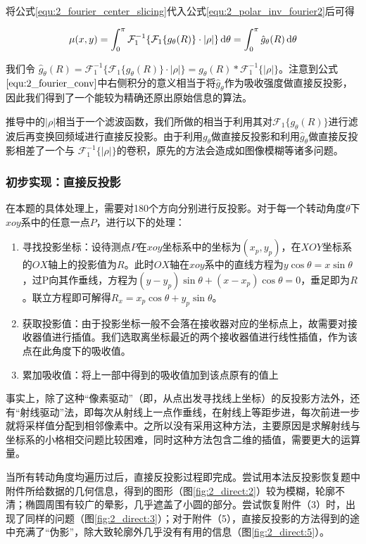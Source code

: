 将公式\ref{equ:2_fourier_center_slicing}代入公式\ref{equ:2_polar_inv_fourier2}后可得

\begin{equation}
	\mu(x, y) = \int_0^{\pi} \mathcal F_1^{-1} \{ \mathcal F_1\{ g_\theta(R) \}\cdot |\rho| \} \mathop{}\!\mathrm{d} \theta
	          = \int_0^\pi \hat g_\theta(R) \mathop{}\!\mathrm{d} \theta
	\label{equ:2_fourier_conv}
\end{equation}

我们令 $\hat g_\theta(R) = \mathcal F_1^{-1} \{ \mathcal F_1\{ g_\theta(R) \}\cdot |\rho| \} = g_\theta(R) \ast \mathcal F^{-1}_1 \{ |\rho| \}$。注意到公式$\ref{equ:2_fourier_conv}$中右侧积分的意义相当于将$\hat g_\theta$作为吸收强度做直接反投影，因此我们得到了一个能较为精确还原出原始信息的算法。

推导中的$|\rho|$相当于一个滤波函数，我们所做的相当于利用其对$\mathcal F_1\{ g_\theta(R) \}$进行滤波后再变换回频域进行直接反投影。由于利用$g_\theta$做直接反投影和利用$\hat g_\theta$做直接反投影相差了一个与 $\mathcal F_1^{-1}\{ |\rho| \}$的卷积，原先的方法会造成如图像模糊等诸多问题。

\subsubsection{初步实现：直接反投影}
在本题的具体处理上，需要对180个方向分别进行反投影。对于每一个转动角度$\theta$下$xoy$系中的任意一点$P$，进行以下的处理：
\begin{enumerate}
  \item 寻找投影坐标：设待测点$P$在$xoy$坐标系中的坐标为$(x_p,y_p)$，在$XOY$坐标系的$OX$轴上的投影值为$R$。此时$OX$轴在$xoy$系中的直线方程为$y\cos\theta=x\sin\theta$，过P向其作垂线，方程为$(y-y_p)\sin\theta+(x-x_p)\cos\theta=0$，垂足即为$R$。联立方程即可解得$R_x=x_p\cos\theta+y_p\sin\theta$。
  \item 获取投影值：由于投影坐标一般不会落在接收器对应的坐标点上，故需要对接收器值进行插值。我们选取离坐标最近的两个接收器值进行线性插值，作为该点在此角度下的吸收值。
  \item 累加吸收值：将上一部中得到的吸收值加到该点原有的值上
\end{enumerate}

事实上，除了这种“像素驱动”（即，从点出发寻找线上坐标）的反投影方法外，还有“射线驱动”法，即每次从射线上一点作垂线，在射线上等距步进，每次前进一步就将采样值分配到相邻像素中。之所以没有采用这种方法，主要原因是求解射线与坐标系的小格相交问题比较困难，同时这种方法包含二维的插值，需要更大的运算量。

当所有转动角度均遍历过后，直接反投影过程即完成。尝试用本法反投影恢复题中附件所给数据的几何信息，得到的图形（图\ref{fig:2_direct:2}）较为模糊，轮廓不清；椭圆周围有较广的晕影，几乎遮盖了小圆的部分。尝试恢复附件（3）时，出现了同样的问题（图\ref{fig:2_direct:3}）；对于附件（5），直接反投影的方法得到的途中充满了“伪影”，除大致轮廓外几乎没有有用的信息（图\ref{fig:2_direct:5}）。

